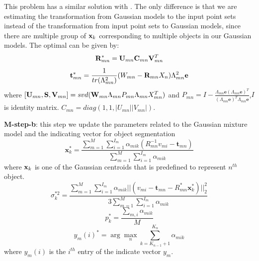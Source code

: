 This problem has a similar solution with \cite{Evangelidis2014}. 
The only difference is that we are estimating the transformation from Gaussian models to the input point sets instead of the transformation from input point sets to Gaussian models, since there are multiple group of $\mathbf{x}_k$ corresponding to multiple objects in our Gaussian models. The optimal can be given by:
%
\begin{equation}
\label{equ:updateR}
\mathbf{R}_{mn}^*=\mathbf{U}_{mn}\mathbf{C}_{mn}\mathbf{V}_{mn}^T
\end{equation}
\begin{equation}
\label{equ:updatet}
\mathbf{t}_{mn}^*=\frac{1}{tr(\Lambda_{mn}^2)}(W_{mn}-\mathbf{R}_{mn}X_n)\Lambda_{mn}^2\mathbf{e}
\end{equation}
where $[\mathbf{U}_{mn},\mathbf{S},\mathbf{V}_{mn}]=svd( \mathbf{W}_{mn}\Lambda_{mn}P_{mn}\Lambda_{mn}X_{mn}^T )$ and $P_{mn}=I-\frac{\Lambda_{mn}\mathbf{e}(\Lambda_{mn}\mathbf{e})^T}{(\Lambda_{mn}\mathbf{e})^T\Lambda_{mn}\mathbf{e}}$,$I$ is identity matrix. $C_{mn}=diag(1,1,|U_{mn}||V_{mn}|)$.

\textbf{M-step-b}: this step we update the parameters related to the Gaussian mixture model and the indicating vector for object segmentation 
\begin{equation}
\label{equ:updatexk}
\pmb x_k^*=\frac{\sum_{m=1}^M\sum_{i=1}^{I_m}\alpha_{mik}(R_{mn}^{-1}v_{mi}-\pmb t_{mn})}{\sum_{m=1}^M\sum_{i=1}^{I_m}\alpha_{mik}}
\end{equation}
where $\mathbf{x}_k$ is one of the Gaussian centroids that is predefined to represent  $n^{th}$ object. 
\begin{equation}
\label{equ:updatesigma}
\sigma_k^{*2}=\frac{\sum_{m=1}^M\sum_{i=1}^{I_m}\alpha_{mik}||(v_{mi}-\pmb t_{mn}-R_{mn}^*\pmb x_k^*)||_2^2}{3\sum_{m=1}^M\sum_{i=1}^{I_m}\alpha_{mik}}
\end{equation}
\begin{equation}
\label{equ:updatepk}
p_k^*=\frac{\sum_{m,i}\alpha_{mik}}{M}
\end{equation}
\begin{equation}
\label{equ:updatey}
y_{m}(i)^*=\arg \max_n \sum_{k=K_{n-1}+1}^{K_n} \alpha_{mik} 
\end{equation}
where $y_{m}(i)$ is the $i^{th}$ entry of the indicate vector $y_m$.
